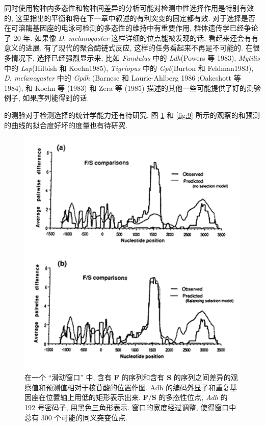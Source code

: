 \documentclass[12pt]{article}
\begin{document}
同时使用物种内多态性和物种间差异的分析可能对检测中性选择作用是特别有效的,
这里指出的平衡和将在下一章中叙述的有利突变的固定都有效.
对于选择是否在可溶酶基因座的电泳可检测的多态性的维持中有重要作用, 群体遗传学已经争论了 20 年.
如果像 \textit{D. melanogaster} 这样详细的位点能被发现的话, 看起来还会有有意义的进展.
有了现代的聚合酶链式反应, 这样的任务看起来不再是不可能的. 在很多情况下, 选择已经强烈显示来,
比如 \textit{Fundulus} 中的 \textit{Ldh}(Powers 等 1983), \textit{Mytilis} 中的 \textit{Lap}(Hilbish 和
Koehn1985), \textit{Tigriopus} 中的 \textit{Gpt}(Burton 和 Feldman1983), \textit{D.
    melanogaster} 中的 \textit{Gpdh} (Barnese 和 Laurie-Ahlberg 1986 ;Oakeshott 等 1984), 和 Koehn 等 (1983)
和 Zera 等 (1985) 描述的其他一些可能提供了好的测验例子, 如果序列能得到的话.

\textcite{hudson1987} 的测验对于检测选择的统计学能力还有待研究.
图 \ref{fig:8} 和 \ref{fig:9} 所示的观察的和预测的曲线的拟合度好坏的度量也有待研究.

\begin{figure}
    \centering
    \includegraphics{coalescent-process.images/image8.png}
    \caption{
        在一个 ``滑动窗口'' 中, 含有 \textbf{F} 的序列和含有 \textbf{S} 的序列之间差异的观察值和预测值相对于核苷酸的位置作图.
        Adh 的编码外显子和重复基因座在位置轴上用低的矩形表示出来.
        \textbf{F}/\textbf{S} 的多态性位点, \textit{Adh} 的 192 号密码子, 用黑色三角形表示.
        窗口的宽度经过调整, 使得窗口中总有 300 个可能的同义突变位点.
    }
    \label{fig:8}
\end{figure}
\end{document}
